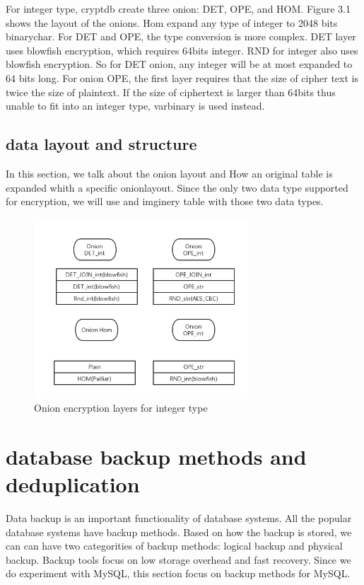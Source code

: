 For integer type, cryptdb create three onion: DET, OPE, and HOM. Figure 3.1 shows the layout of the onions. Hom expand any type of integer to 2048 bits binarychar. For DET and OPE, the type conversion is more complex. DET layer uses blowfish encryption, which requires 64bits integer. RND for integer also uses blowfish encryption. So for DET onion, any integer will be at most expanded to 64 bits long. For onion OPE, the first layer requires that the size of cipher text is twice the size of plaintext. If the size of ciphertext is larger than 64bits thus unable to fit into an integer type, varbinary is used instead. 



\subsection{data layout and structure}

In this section, we talk about the onion layout and How an original table is expanded whith a specific onionlayout. Since the only two data type supported for encryption, we will use and imginery table with those two data types. 








\begin{figure}[tb]
\centering
\includegraphics[width=8cm]{Onion_int.png}
\caption{Onion encryption layers for integer type}
\label{fig:stack}
\end{figure}


\section{database backup methods and deduplication}

Data backup is an important functionality of database systems. All the popular database systems have backup methods. Based on how the backup is stored, we can can have two categorities of backup methods: logical backup and physical backup. Backup tools focus on low storage overhead and fast recovery. Since we do experiment with MySQL, this section focus on backup methods for MySQL. 


